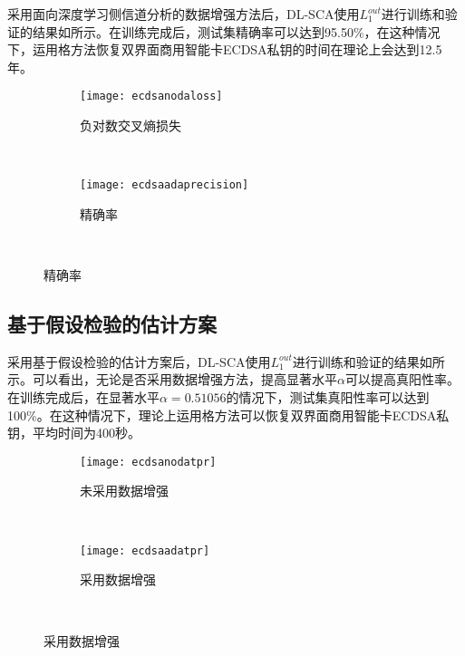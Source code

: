 {	采用面向深度学习侧信道分析的数据增强方法后，DL-SCA使用$L_1^{out}$进行训练和验证的结果如所示。在训练完成后，测试集精确率可以达到95.50\%，在这种情况下，运用格方法恢复双界面商用智能卡ECDSA私钥的时间在理论上会达到12.5年。
	
	\begin{figure}[!h]
		\centering
		\begin{subfigure}[b]{\twof\textwidth}
			\texttt{[image: ecdsanodaloss]}
			\caption{负对数交叉熵损失}
			\label{fig:ecdsaadaloss}
		\end{subfigure}%
		~%
		\begin{subfigure}[b]{\twof\textwidth}
			\texttt{[image: ecdsaadaprecision]}
			\caption{精确率}
			\label{fig:ecdsaadaprecision}
		\end{subfigure}
		\\
		\label{fig:ecdsaada}
	\end{figure}

	\subsection{基于假设检验的估计方案}
	采用基于假设检验的估计方案后，DL-SCA使用$L_1^{out}$进行训练和验证的结果如所示。可以看出，无论是否采用数据增强方法，提高显著水平$\alpha$可以提高真阳性率。在训练完成后，在显著水平$\alpha=0.51056$的情况下，测试集真阳性率可以达到100\%。在这种情况下，理论上运用格方法可以恢复双界面商用智能卡ECDSA私钥，平均时间为400秒。
	
	
	\begin{figure}[!h]
		\centering
		\begin{subfigure}[b]{\twof\textwidth}
			\texttt{[image: ecdsanodatpr]}
			\caption{未采用数据增强}
			\label{fig:ecdsanodatpr}
		\end{subfigure}%
		~%
		\begin{subfigure}[b]{\twof\textwidth}
			\texttt{[image: ecdsaadatpr]}
			\caption{采用数据增强}
			\label{fig:ecdsaadatpr}
		\end{subfigure}
		\\
		\label{fig:ecdsatpr}
	\end{figure}
	
}
